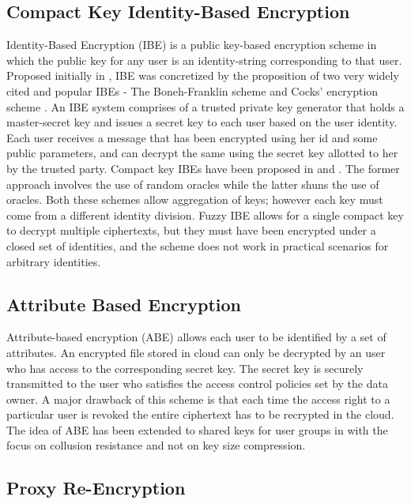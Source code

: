 \subsection{Compact Key Identity-Based Encryption}
\label{subsec:IBE}

Identity-Based Encryption (IBE) is a public key-based encryption scheme in which the public key for any user is an identity-string corresponding to that user. Proposed initially in \cite{shamir1985identity}, IBE was concretized by the proposition of two very widely cited and popular IBEs - The Boneh-Franklin scheme  \cite{boneh2003identity} and Cocks' encryption scheme \cite{cocks2001identity}. An IBE system comprises of a trusted private key generator that holds a master-secret key and issues a secret key to each user based on the user identity. Each user receives a message that has been encrypted using her id and some public parameters, and can decrypt the same using the secret key allotted to her by the trusted party. Compact key IBEs have been proposed in \cite{guo2007identity} and \cite{guo2008multi}. The former approach involves the use of random oracles while the latter shuns the use of oracles. Both these schemes allow aggregation of keys; however each key must come from a different identity division.
 Fuzzy IBE \cite{sahai2005fuzzy} allows for a single compact key to decrypt multiple ciphertexts, but they must have been encrypted under a closed set of identities, and the scheme does not work in practical scenarios for arbitrary identities. 

\subsection{Attribute Based Encryption}
\label{subsec:ABE}

Attribute-based encryption (ABE) \cite{goyal2006attribute,bethencourt2007ciphertext,chase2007multi} allows each user to be identified by a set of attributes. An encrypted file stored in cloud can only be decrypted by an user who has access to the corresponding secret key. The secret key is securely transmitted to the user who satisfies the access control policies set by the data owner. A major drawback of this scheme is that each time the access right to a particular user is revoked the entire ciphertext has to be recrypted in the cloud. The idea of ABE has been extended to shared keys for user groups in \cite{li2013scalable} with the focus on collusion resistance and not on key size compression.  

\subsection{Proxy Re-Encryption}
\label{subsec:PBE}

